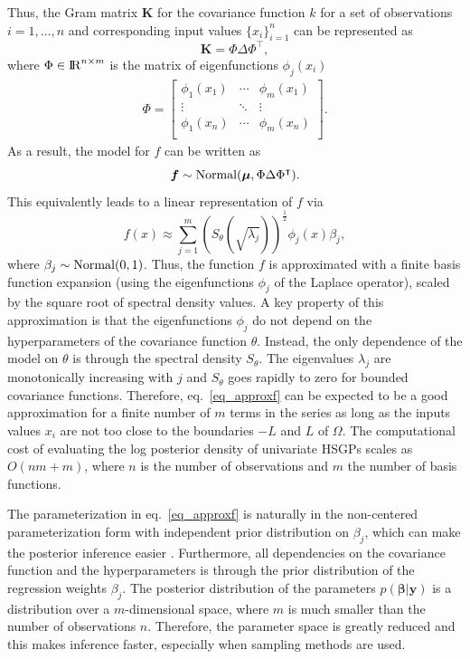 Thus, the Gram matrix $\bm{K}$ for the covariance function $k$ for a set of observations $i=1,\ldots,n$ and corresponding input values $\{x_i\}_{i=1}^{n}$ can be represented as
%
\begin{equation}
 \bm{K} = \Phi \Delta \Phi^\intercal, \nonumber
\end{equation}
%
where $\Phi \in {\rm I\!R}^{n\times m}$ is the matrix of eigenfunctions $\phi_j(x_i)$
%
\begin{align}
\Phi =  \left[ {\begin{array}{ccc}
   \phi_1(x_1) & \cdots & \phi_m(x_1)  \\
    \vdots &\ddots & \vdots  \nonumber \\ 
    \phi_1(x_n) & \cdots & \phi_m(x_n) \\
  \end{array} } \right].
\end{align}
As a result, the model for $f$ can be written as
%
\begin{equation}
\bm{f} \sim \operatorname{Normal}(\bm{\mu},\Phi \Delta \Phi^\intercal). \nonumber
\end{equation}
This equivalently leads to a linear representation of $f$ via
%
\begin{equation}\label{eq_approxf}
f(x) \approx \sum_{j=1}^m \left( S_{\theta}(\sqrt{\lambda_j})\right)^{\frac{1}{2}} \phi_j(x) \beta_j,
\end{equation}
%
where $\beta_j \sim \operatorname{Normal}(0,1)$. Thus, the function $f$ is approximated with a finite basis function expansion (using the eigenfunctions $\phi_j$ of the Laplace operator), scaled by the square root of spectral density values. A key property of this approximation is that the eigenfunctions $\phi_j$ do not depend on the hyperparameters of the covariance function $\theta$. Instead, the only dependence of the model on $\theta$ is through the spectral density $S_{\theta}$. The eigenvalues $\lambda_j$ are monotonically increasing with $j$ and $S_{\theta}$ goes rapidly to zero for bounded covariance functions. Therefore, eq.~\eqref{eq_approxf} can be expected to be a good approximation for a finite number of $m$ terms in the series as long as the inputs values $x_i$ are not too close to the boundaries $-L$ and $L$ of $\Omega$. The computational cost of evaluating the log posterior density of univariate HSGPs scales as $O(nm + m)$, where $n$ is the number of observations and $m$ the number of basis functions.

The parameterization in eq.~\eqref{eq_approxf} is naturally in the non-centered parameterization form with independent prior distribution on $\beta_j$, which can make the posterior inference easier \citep[see, e.g., ][]{Betancourt+Girolami:2019}. Furthermore, all dependencies on the covariance function and the hyperparameters is through the prior distribution of the regression weights $\beta_j$. The posterior distribution of the parameters $p(\bm{\beta}|\bm{y})$ is a distribution over a $m$-dimensional space, where $m$ is much smaller than the number of observations $n$. Therefore, the parameter space is greatly reduced and this makes inference faster, especially when sampling methods are used.

